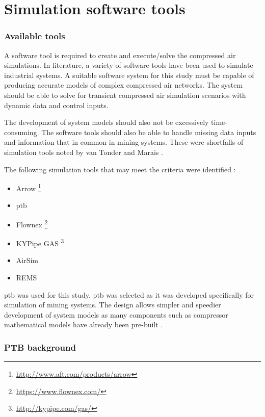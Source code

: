 \section{Simulation software tools}
\subsubsection{Available tools}
A software tool is required to create and execute/solve the compressed air simulations. In literature, a variety of software tools have been used to simulate industrial systems. A suitable software system for this study must be capable of producing accurate models of complex compressed air networks. The system should be able to solve for transient compressed air simulation scenarios with dynamic data and control inputs.
\par 
The development of system models should also not be excessively time-consuming. The software tools should also be able to handle missing data inputs and information that in common in mining systems. These were shortfalls of simulation tools noted by van Tonder \cite{vanTonder2014PhD} and Marais \cite{Mare2016PhD}.
\par
The following simulation tools that may meet the criteria were identified : 
\begin{itemize}
	\item Arrow \footnote{\url{http://www.aft.com/products/arrow}}
	\item \gls{ptb}
	\item Flownex \footnote{\url{https://www.flownex.com/}}
	\item KYPipe GAS \footnote{\url{http://kypipe.com/gas/}}
	\item AirSim
	\item REMS
\end{itemize}
 \gls{ptb} was used for this study. \gls{ptb} was selected as it was developed specifically for simulation of mining systems. The design allows simpler and speedier development of system models as many components such as compressor mathematical models have already been pre-built \cite{Mare2016PhD}. 
 \subsubsection{PTB background}
